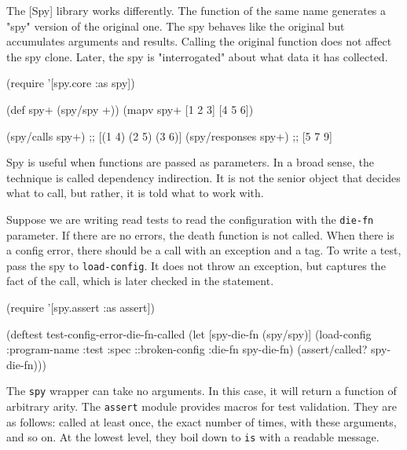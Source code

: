 \fi


The [Spy] library works differently. The function of the same name generates a "spy" version of the original one. The spy behaves like the original but accumulates arguments and results. Calling the original function does not affect the spy clone. Later, the spy is "interrogated" about what data it has collected.

\begin{english}
  \begin{clojure}
(require '[spy.core :as spy])

(def spy+ (spy/spy +))
(mapv spy+ [1 2 3] [4 5 6])

(spy/calls spy+)
;; [(1 4) (2 5) (3 6)]
(spy/responses spy+)
;; [5 7 9]
  \end{clojure}
\end{english}



Spy is useful when functions are passed as parameters. In a broad sense, the technique is called dependency indirection. It is not the senior object that decides what to call, but rather, it is told what to work with.

Suppose we are writing read tests to read the configuration with the \verb|die-fn| parameter. If there are no errors, the death function is not called. When there is a config error, there should be a call with an exception and a tag. To write a test, pass the spy to \verb|load-config|. It does not throw an exception, but captures the fact of the call, which is later checked in the statement.

\begin{english}
  \begin{clojure}
(require '[spy.assert :as assert])

(deftest test-config-error-die-fn-called
  (let [spy-die-fn (spy/spy)]
    (load-config {:program-name :test
                  :spec ::broken-config
                  :die-fn spy-die-fn})
    (assert/called? spy-die-fn)))
  \end{clojure}
\end{english}

The \verb|spy| wrapper can take no arguments. In this case, it will return a function of arbitrary arity. The \verb|assert| module provides macros for test validation. They are as follows: called at least once, the exact number of times, with these arguments, and so on. At the lowest level, they boil down to \verb|is| with a readable message.

